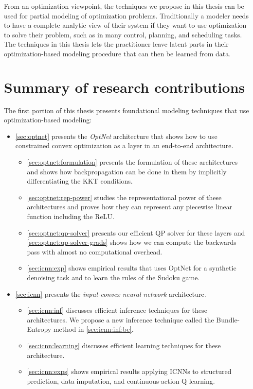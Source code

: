 From an optimization viewpoint, the techniques we propose
in this thesis can be used for partial modeling of
optimization problems.
Traditionally a modeler needs to have a complete analytic view
of their system if they want to use optimization to solve
their problem, such as in many control, planning, and scheduling tasks.
The techniques in this thesis lets the practitioner
leave latent parts in their optimization-based modeling
procedure that can then be learned from data.

\section{Summary of research contributions}
The first portion of this thesis presents foundational
modeling techniques that use optimization-based modeling:
\begin{itemize}
\item \cref{sec:optnet} presents the \emph{OptNet} architecture
  that shows how to use constrained convex optimization
  as a layer in an end-to-end architecture.
  \begin{itemize}
  \item \cref{sec:optnet:formulation} presents the
    formulation of these architectures and shows how
    backpropagation can be done in them by
    implicitly differentiating the KKT conditions.
  \item \cref{sec:optnet:rep-power} studies the
    representational power of these architectures and proves
    how they can represent any piecewise linear function
    including the ReLU.
  \item \cref{sec:optnet:qp-solver} presents our
    efficient QP solver for these layers and
    \cref{sec:optnet:qp-solver-grads}
    shows how we can compute the backwards pass with
    almost no computational overhead.
  \item \cref{sec:icnn:exp} shows empirical results
    that uses OptNet for a synthetic denoising task
    and to learn the rules of the Sudoku game.
  \end{itemize}
\item \cref{sec:icnn} presents the \emph{input-convex neural
  network} architecture.
  \begin{itemize}
  \item \cref{sec:icnn:inf} discusses efficient inference
    techniques for these architectures.
    We propose a new inference technique called the Bundle-Entropy
    method in \cref{sec:icnn:inf:be}.
  \item \cref{sec:icnn:learning} discusses efficient
    learning techniques for these architecture.
  \item \cref{sec:icnn:exps} shows empirical results applying
    ICNNs to structured prediction, data imputation, and
    continuous-action Q learning.
  \end{itemize}
\end{itemize}

